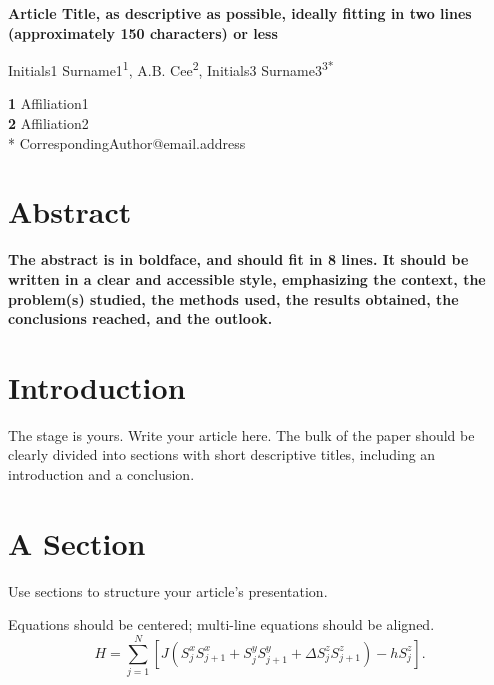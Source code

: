 \documentclass[submission]{SciPost}
\begin{document}
\begin{center}{\Large \textbf{
Article Title, as descriptive as possible, ideally fitting in two lines (approximately 150 characters) or less
}}\end{center}

\begin{center}
Initials1 Surname1\textsuperscript{1}, 
A.B. Cee\textsuperscript{2}, 
Initials3 Surname3\textsuperscript{3*}
\end{center}

\begin{center}
{\bf 1} Affiliation1
\\
{\bf 2} Affiliation2
\\
* CorrespondingAuthor@email.address
\bigskip
\end{center}

\linenumbers

\section*{Abstract}
{\bf 
The abstract is in boldface, and should fit in 8 lines.
It should be written in a clear and accessible style, emphasizing the context, the problem(s) studied, the methods used, the results obtained, the conclusions reached, and the outlook. 
}

\section{Introduction}
\label{sec:intro}
The stage is yours. Write your article here.
The bulk of the paper should be clearly divided into sections with short descriptive titles, including an introduction and a conclusion.


\section{A Section}
Use sections to structure your article's presentation. 

Equations should be centered; multi-line equations should be aligned.
\begin{equation}
H = \sum_{j=1}^N \left[J (S^x_j S^x_{j+1} + S^y_j S^y_{j+1} + \Delta S^z_j S^z_{j+1}) - h S^z_j \right].
\end{equation}
\end{document}
